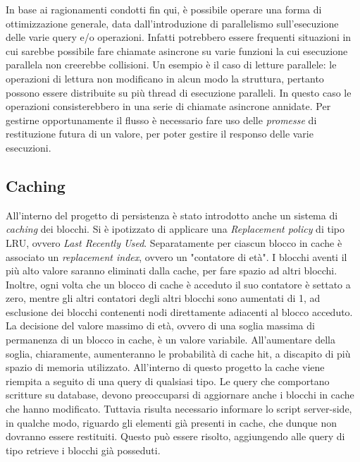 		In base ai ragionamenti condotti fin qui, è possibile operare una forma di ottimizzazione generale, data dall'introduzione di parallelismo sull'esecuzione delle varie query e/o operazioni. Infatti potrebbero essere frequenti situazioni in cui sarebbe possibile fare chiamate asincrone su varie funzioni la cui esecuzione parallela non creerebbe collisioni. Un esempio è il caso di letture parallele: le operazioni di lettura non modificano in alcun modo la struttura, pertanto possono essere distribuite su più thread di esecuzione paralleli. In questo caso le operazioni consisterebbero in una serie di chiamate asincrone annidate. Per gestirne opportunamente il flusso è necessario fare uso delle \textit{promesse} di restituzione futura di un valore, per poter gestire il responso delle varie esecuzioni.
		
	\subsection{Caching}
	


		All'interno del progetto di persistenza è stato introdotto anche un sistema di \textit{caching} dei blocchi. Si è ipotizzato di applicare una \textit{Replacement policy} di tipo LRU, ovvero \textit{Last Recently Used}. Separatamente per ciascun blocco in cache è associato un \textit{replacement index}, ovvero un "contatore di età". I blocchi aventi il più alto valore saranno eliminati dalla cache, per fare spazio ad altri blocchi. Inoltre, ogni volta che un blocco di cache è acceduto il suo contatore è settato a zero, mentre gli altri contatori degli altri blocchi sono aumentati di 1, ad esclusione dei blocchi contenenti nodi direttamente adiacenti al blocco acceduto. La decisione del valore massimo di età, ovvero di una soglia massima di permanenza di un blocco in cache, è un valore variabile. All'aumentare della soglia, chiaramente, aumenteranno le probabilità di cache hit, a discapito di più spazio di memoria utilizzato.
		All'interno di questo progetto la cache viene riempita a seguito di una query di qualsiasi tipo. Le query che comportano scritture su database, devono preoccuparsi di aggiornare anche i blocchi in cache che hanno modificato.
		Tuttavia risulta necessario informare lo script server-side, in qualche modo, riguardo gli elementi già presenti in cache, che dunque non dovranno essere restituiti. Questo può essere risolto, aggiungendo alle query di tipo retrieve i blocchi già posseduti.
		

